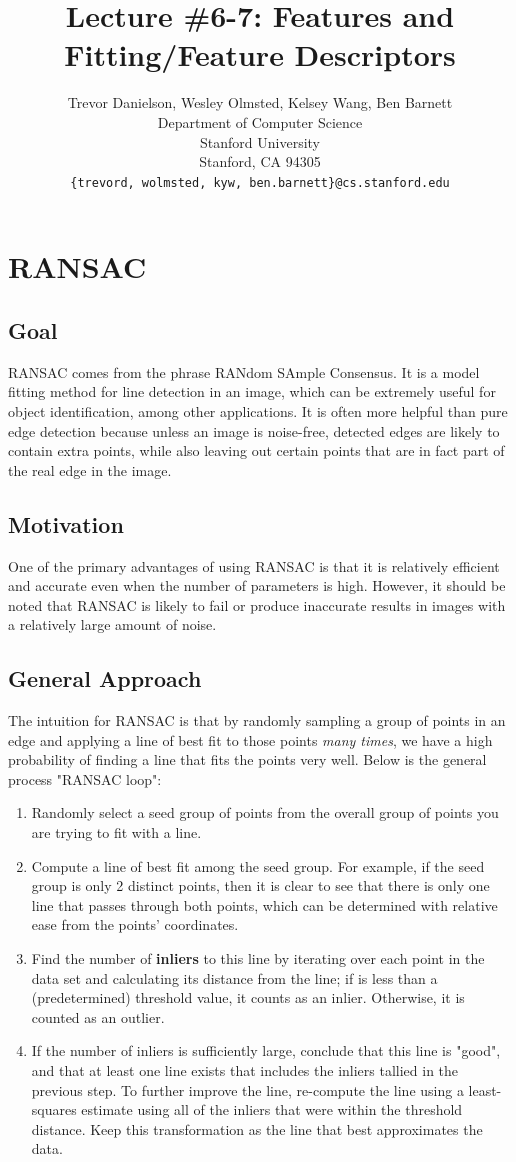\documentclass{article}
\title{Lecture \#6-7: Features and Fitting/Feature Descriptors}
\author{
  Trevor Danielson, Wesley Olmsted, Kelsey Wang, Ben Barnett \\
  Department of Computer Science\\
  Stanford University\\
  Stanford, CA 94305 \\
  \texttt{\{trevord, wolmsted, kyw, ben.barnett\}@cs.stanford.edu} \\
}
\begin{document}
\maketitle


\section{RANSAC}
\subsection{Goal}
RANSAC comes from the phrase RANdom SAmple Consensus. It is a model fitting method for line detection in an image, which can be extremely useful for object identification, among other applications. It is often more helpful than pure edge detection because unless an image is noise-free, detected edges are likely to contain extra points, while also leaving out certain points that are in fact part of the real edge in the image.
\subsection{Motivation}
One of the primary advantages of using RANSAC is that it is relatively efficient and accurate even when the number of parameters is high. However, it should be noted that RANSAC is likely to fail or produce inaccurate results in images with a relatively large amount of noise.
\subsection{General Approach}
The intuition for RANSAC is that by randomly sampling a group of points in an edge and applying a line of best fit to those points \textit{many times}, we have a high probability of finding a line that fits the points very well. Below is the general process "RANSAC loop":
\begin{enumerate}
\item Randomly select a seed group of points from the overall group of points you are trying to fit with a line.
\item Compute a line of best fit among the seed group. For example, if the seed group is only 2 distinct points, then it is clear to see that there is only one line that passes through both points, which can be determined with relative ease from the points' coordinates.
\item Find the number of \textbf{inliers} to this line by iterating over each point in the data set and calculating its distance from the line; if is less than a (predetermined) threshold value, it counts as an inlier. Otherwise, it is counted as an outlier.
\item If the number of inliers is sufficiently large, conclude that this line is "good", and that at least one line exists that includes the inliers tallied in the previous step. To further improve the line, re-compute the line using a least-squares estimate using all of the inliers that were within the threshold distance. Keep this transformation as the line that best approximates the data.
\end{enumerate}
\end{document}
